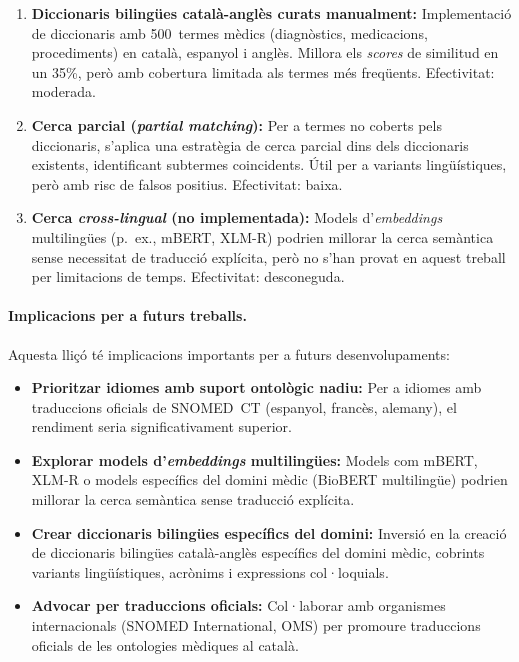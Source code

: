 \documentclass[CAT]{TFUOC}%
\begin{document}
\begin{enumerate}
    \item \textbf{Diccionaris bilingües català-anglès curats manualment:} Implementació de diccionaris amb 500~termes mèdics (diagnòstics, medicacions, procediments) en català, espanyol i anglès. Millora els \textit{scores} de similitud en un 35\%, però amb cobertura limitada als termes més freqüents. Efectivitat: moderada.
    
    \item \textbf{Cerca parcial (\textit{partial matching}):} Per a termes no coberts pels diccionaris, s'aplica una estratègia de cerca parcial dins dels diccionaris existents, identificant subtermes coincidents. Útil per a variants lingüístiques, però amb risc de falsos positius. Efectivitat: baixa.
    
    \item \textbf{Cerca \textit{cross-lingual} (no implementada):} Models d'\textit{embeddings} multilingües (p.~ex., mBERT, XLM-R) podrien millorar la cerca semàntica sense necessitat de traducció explícita, però no s'han provat en aquest treball per limitacions de temps. Efectivitat: desconeguda.
\end{enumerate}

\paragraph{Implicacions per a futurs treballs.}
Aquesta lliçó té implicacions importants per a futurs desenvolupaments:

\begin{itemize}
    \item \textbf{Prioritzar idiomes amb suport ontològic nadiu:} Per a idiomes amb traduccions oficials de SNOMED~CT (espanyol, francès, alemany), el rendiment seria significativament superior.
    
    \item \textbf{Explorar models d'\textit{embeddings} multilingües:} Models com mBERT, XLM-R o models específics del domini mèdic (BioBERT multilingüe) podrien millorar la cerca semàntica sense traducció explícita.
    
    \item \textbf{Crear diccionaris bilingües específics del domini:} Inversió en la creació de diccionaris bilingües català-anglès específics del domini mèdic, cobrints variants lingüístiques, acrònims i expressions col·loquials.
    
    \item \textbf{Advocar per traduccions oficials:} Col·laborar amb organismes internacionals (SNOMED International, OMS) per promoure traduccions oficials de les ontologies mèdiques al català.
\end{itemize}
\end{document}
